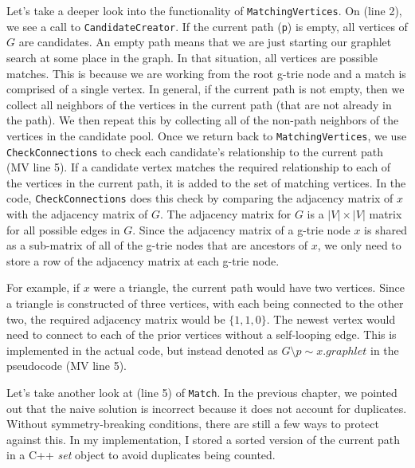 \documentclass[12pt,twoside]{reedthesis}
\begin{document}
Let's take a deeper look into the functionality of \texttt{MatchingVertices}. On (line 2), we see a call to \texttt{CandidateCreator}. If the current path (\texttt{p}) is empty, all vertices of $G$ are candidates. An empty path means that we are just starting our graphlet search at some place in the graph. In that situation, all vertices are possible matches. This is because we are working from the root g-trie node and a match is comprised of a single vertex. In general, if the current path is not empty, then we collect all neighbors of the vertices in the current path (that are not already in the path). We then repeat this by collecting all of the non-path neighbors of the vertices in the candidate pool. Once we return back to \texttt{MatchingVertices}, we use \texttt{CheckConnections} to check each candidate's relationship to the current path (MV line 5). If a candidate vertex matches the required relationship to each of the vertices in the current path, it is added to the set of matching vertices. In the code, \texttt{CheckConnections} does this check by comparing the adjacency matrix of $x$ with the adjacency matrix of $G$. The adjacency matrix for $G$ is a $|V| \times |V|$ matrix for all possible edges in $G$. Since the adjacency matrix of a g-trie node $x$ is shared as a sub-matrix of all of the g-trie nodes that are ancestors of $x$, we only need to store a row of the adjacency matrix at each g-trie node.


For example, if $x$ were a triangle, the current path would have two vertices. Since a triangle is constructed of three vertices, with each being connected to the other two, the required adjacency matrix would be $\{1,1,0\}$. The newest vertex would need to connect to each of the prior vertices without a self-looping edge. This is implemented in the actual code, but instead denoted as $G \setminus p \sim x.graphlet$ in the pseudocode (MV line 5).

Let's take another look at (line 5) of \texttt{Match}. In the previous chapter, we pointed out that the naive solution is incorrect because it does not account for duplicates. Without symmetry-breaking conditions, there are still a few ways to protect against this. In my implementation, I stored a sorted version of the current path in a C++ \textit{set} object to avoid duplicates being counted.
	
\end{document}

